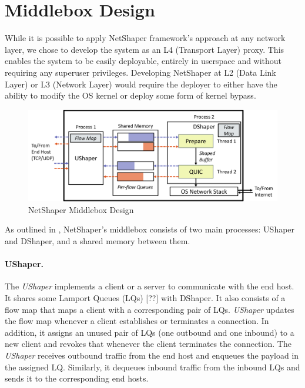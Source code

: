 \section{Middlebox Design}
\label{sec:netshaper-middlebox-design}

While it is possible to apply NetShaper framework's approach at any network layer, we chose to develop the system as an L4 (Transport Layer) proxy.
This enables the system to be easily deployable, entirely in userspace and without requiring any superuser privileges. 
Developing NetShaper at L2 (Data Link Layer) or L3 (Network Layer) would require the deployer to either have the ability to modify the OS kernel or deploy some form of kernel bypass.

\begin{figure}[!htb]
    \centering
    \includegraphics[width=\columnwidth]{figures/netshaper/middlebox-design.png}
    \caption{NetShaper Middlebox Design}
    \label{fig:middlebox-design}
\end{figure}

As outlined in , NetShaper's middlebox consists of two main processes: UShaper and DShaper, and a shared memory between them.

\paragraph{UShaper.}
The \textit{UShaper} implements a client or a server to communicate with the end host.
It shares some Lamport Queues (LQs) [??] with DShaper.
It also consists of a flow map that maps a client with a corresponding pair of LQs.
\textit{UShaper} updates the flow map whenever a client establishes or terminates a connection.
In addition, it assigns an unused pair of LQs (one outbound and one inbound) to a new client and revokes that whenever the client terminates the connection.
The \textit{UShaper} receives outbound traffic from the end host and enqueues the payload in the assigned LQ.
Similarly, it dequeues inbound traffic from the inbound LQs and sends it to the corresponding end hosts.

